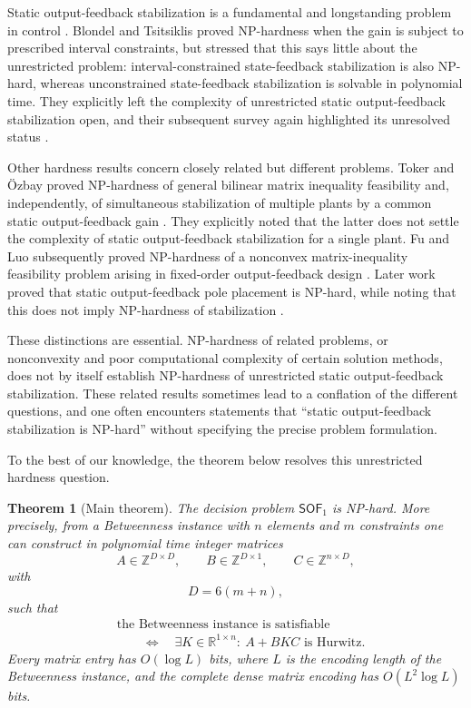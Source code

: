 \documentclass[final,5p,times,twocolumn]{elsarticle}
\newcommand{\R}{\mathbb R}
\newtheorem{theorem}{Theorem}[section]
\begin{document}
Static output-feedback stabilization is a fundamental and longstanding problem in control \cite{SYRMOS1997125}. Blondel and Tsitsiklis proved NP-hardness when the gain is subject to prescribed interval constraints, but stressed that this says little about the unrestricted problem: interval-constrained state-feedback stabilization is also NP-hard, whereas unconstrained state-feedback stabilization is solvable in polynomial time. They explicitly left the complexity of unrestricted static output-feedback stabilization open, and their subsequent survey again highlighted its unresolved status \cite{BlondelTsitsiklis1997,BlondelTsitsiklis2000}.

Other hardness results concern closely related but different problems. Toker and Özbay proved NP-hardness of general bilinear matrix inequality
feasibility and, independently, of simultaneous stabilization of
multiple plants by a common static output-feedback gain
\cite{TokerOzbay1995}. They explicitly noted that the latter does not
settle the complexity of static output-feedback stabilization for a
single plant. Fu and Luo subsequently proved NP-hardness of a
nonconvex matrix-inequality feasibility problem arising in fixed-order
output-feedback design \cite{FuLuo1997}. Later work proved that static
output-feedback pole placement is NP-hard, while noting that this does
not imply NP-hardness of stabilization \cite{Fu2004}.

These distinctions are essential. NP-hardness of related problems, or nonconvexity and poor computational complexity of certain solution methods, does not by itself establish NP-hardness of unrestricted static output-feedback stabilization. These related results sometimes lead to a conflation of the different questions, and one often encounters statements that ``static output-feedback stabilization is NP-hard'' without specifying the precise problem formulation.

To the best of our knowledge, the theorem below resolves this unrestricted hardness question.

\begin{theorem}[Main theorem]\label{thm:main}
The decision problem $\mathsf{SOF}_{1}$ is NP-hard. More precisely, from a Betweenness instance with $n$ elements and $m$ constraints one can construct in polynomial time integer matrices
\[
A\in\mathbb Z^{D\times D},\qquad
B\in\mathbb Z^{D\times1},\qquad
C\in\mathbb Z^{n\times D},
\]
with
\[
D=6(m+n),
\]
such that
\[
\begin{aligned}
&\text{the Betweenness instance is satisfiable}\\
&\qquad\Longleftrightarrow\quad
\exists K\in\R^{1\times n}:\ A+BKC\text{ is Hurwitz}.
\end{aligned}
\]
Every matrix entry has $O(\log L)$ bits, where $L$ is the encoding length of the Betweenness instance, and the complete dense matrix encoding has $O(L^2\log L)$ bits.
\end{theorem}
\end{document}

